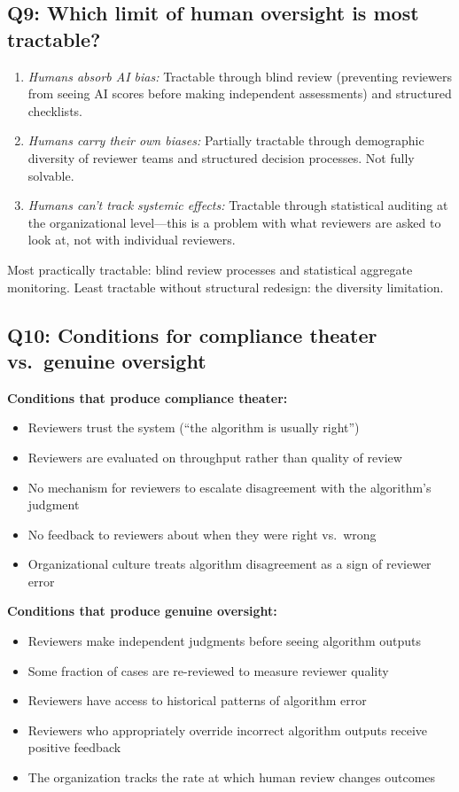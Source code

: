 \subsection*{Q9: Which limit of human oversight is most tractable?}

\begin{enumerate}
    \item \textit{Humans absorb AI bias:} Tractable through blind review (preventing reviewers from seeing AI scores before making independent assessments) and structured checklists.
    \item \textit{Humans carry their own biases:} Partially tractable through demographic diversity of reviewer teams and structured decision processes. Not fully solvable.
    \item \textit{Humans can't track systemic effects:} Tractable through statistical auditing at the organizational level---this is a problem with what reviewers are asked to look at, not with individual reviewers.
\end{enumerate}

Most practically tractable: blind review processes and statistical aggregate monitoring. Least tractable without structural redesign: the diversity limitation.

\subsection*{Q10: Conditions for compliance theater vs.\ genuine oversight}

\textbf{Conditions that produce compliance theater:}
\begin{itemize}
    \item Reviewers trust the system (``the algorithm is usually right'')
    \item Reviewers are evaluated on throughput rather than quality of review
    \item No mechanism for reviewers to escalate disagreement with the algorithm's judgment
    \item No feedback to reviewers about when they were right vs.\ wrong
    \item Organizational culture treats algorithm disagreement as a sign of reviewer error
\end{itemize}

\textbf{Conditions that produce genuine oversight:}
\begin{itemize}
    \item Reviewers make independent judgments before seeing algorithm outputs
    \item Some fraction of cases are re-reviewed to measure reviewer quality
    \item Reviewers have access to historical patterns of algorithm error
    \item Reviewers who appropriately override incorrect algorithm outputs receive positive feedback
    \item The organization tracks the rate at which human review changes outcomes
\end{itemize}

